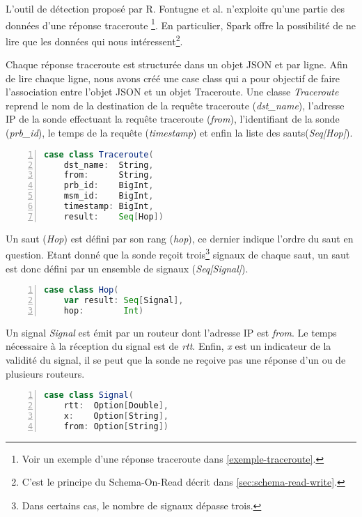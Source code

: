 L'outil de détection proposé par R. Fontugne et al. n'exploite qu'une partie des données d'une réponse traceroute \footnote{Voir un exemple d'une réponse  traceroute  dans \ref{exemple-traceroute}.}. 
En particulier, Spark offre la possibilité de ne lire que les données qui nous intéressent\footnote{C'est le principe du Schema-On-Read décrit dans \ref{sec:schema-read-write}.}. 

Chaque réponse traceroute est structurée dans un objet JSON et par ligne. Afin de lire chaque ligne, nous avons créé une case class qui a pour objectif de faire l'association entre l'objet JSON  et un objet Traceroute. Une classe \textit{Traceroute} reprend le nom de la destination de la requête traceroute (\textit{dst\_name}), l'adresse IP de la sonde effectuant la requête traceroute (\textit{from}), l'identifiant de la sonde (\textit{prb\_id}), le temps de la requête (\textit{timestamp}) et enfin la liste des sauts(\textit{Seq[Hop]}).


\begin{lstlisting}[language=scala,firstnumber=1, caption={Description du case class Traceroute},label={lst:case-class-Traceroute}, basicstyle = \footnotesize,escapechar=|,numbers=left,
stepnumber=1]
case class Traceroute(
	dst_name:  String,
	from:      String,
	prb_id:    BigInt,
	msm_id:    BigInt,
	timestamp: BigInt,
	result:    Seq[Hop])
\end{lstlisting}

Un saut (\textit{Hop})  est défini par son rang (\textit{hop}), ce dernier indique l'ordre du saut en question. Etant donné que la sonde reçoit trois\footnote{Dans certains cas, le nombre de signaux dépasse trois.} signaux de chaque saut, un saut est donc défini par un ensemble de signaux (\textit{Seq[Signal]}).
\begin{lstlisting}[language=scala,firstnumber=1, caption={Description du case class Hop},label={lst:case-class-hop}, basicstyle = \footnotesize,escapechar=|,numbers=left,
stepnumber=1]
case class Hop(
	var result: Seq[Signal],
	hop:        Int)
\end{lstlisting}

Un signal \textit{Signal} est émit par  un routeur  dont l'adresse IP est \textit{from}. Le temps nécessaire à la réception du signal est de  \textit{rtt}. Enfin, \textit{x} est un indicateur de la validité du signal, il se peut que la sonde ne reçoive pas une réponse d'un ou de plusieurs routeurs. 

\begin{lstlisting}[language=scala,firstnumber=1, caption={Description du case class Signal}, label={lst:case-class-hop}, basicstyle = \footnotesize,escapechar=|,numbers=left,
stepnumber=1]
case class Signal(
	rtt:  Option[Double],
	x:    Option[String],
	from: Option[String])
\end{lstlisting}

